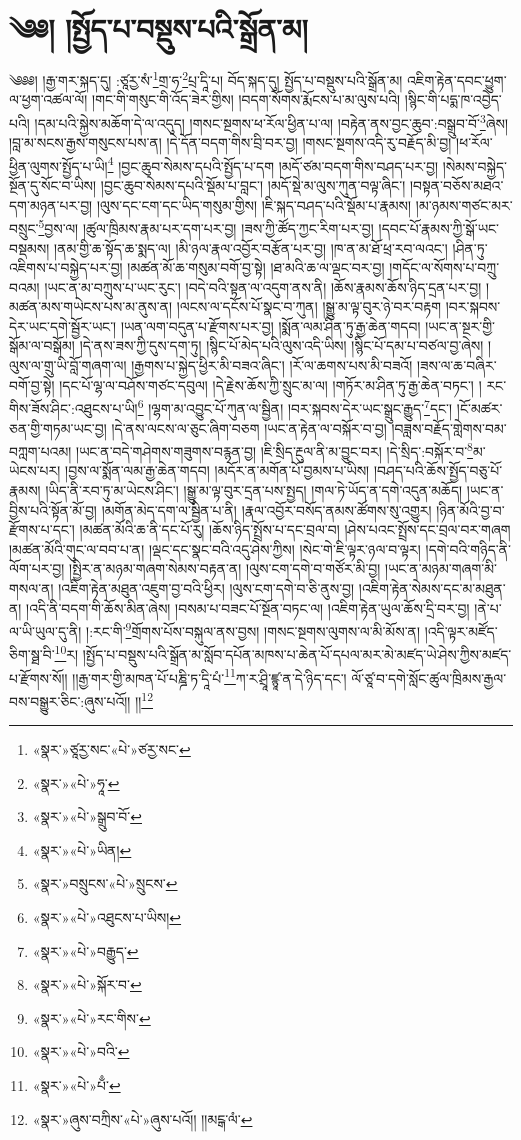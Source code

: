\chapter{༄༅། །སྤྱོད་པ་བསྡུས་པའི་སྒྲོན་མ།}༄༅༅། །རྒྱ་གར་སྐད་དུ། :ཙཱརྱ་སཾ་\footnote{«སྣར་»ཙཱརྱ་སང་«པེ་»ཙརྱ་སང་}གྲ་ཧ་\footnote{«སྣར་»«པེ་»ཧཱ་}པྲ་དཱི་པ། བོད་སྐད་དུ། སྤྱོད་པ་བསྡུས་པའི་སྒྲོན་མ། འཇིག་རྟེན་དབང་ཕྱུག་ལ་ཕྱག་འཚལ་ལོ། །གང་གི་གསུང་གི་འོད་ཟེར་གྱིས། །བདག་སོགས་རྨོངས་པ་མ་ལུས་པའི། །སྙིང་གི་པདྨ་ཁ་འབྱེད་པའི། །དམ་པའི་སྐྱེས་མཆོག་དེ་ལ་འདུད། །གསང་སྔགས་ཕ་རོལ་ཕྱིན་པ་ལ། །བརྟེན་ནས་བྱང་ཆུབ་:བསྒྲུབ་བོ་\footnote{«སྣར་»«པེ་»སྒྲུབ་བོ་}ཞེས། །བླ་མ་སངས་རྒྱས་གསུངས་པས་ན། །དེ་དོན་བདག་གིས་བྲི་བར་བྱ། །གསང་སྔགས་འདི་རུ་བརྗོད་མི་བྱ། །ཕ་རོལ་ཕྱིན་ལུགས་སྤྱོད་པ་ཡི།\footnote{«སྣར་»«པེ་»ཡིན།} །བྱང་ཆུབ་སེམས་དཔའི་སྤྱོད་པ་དག །མདོ་ཙམ་བདག་གིས་བཤད་པར་བྱ། །སེམས་བསྐྱེད་སྔོན་དུ་སོང་བ་ཡིས། །བྱང་ཆུབ་སེམས་དཔའི་སྡོམ་པ་བླང་། །མདོ་སྡེ་མ་ལུས་ཀུན་བལྟ་ཞིང་། །བསྟན་བཅོས་མཐའ་དག་མཉན་པར་བྱ། །ལུས་དང་ངག་དང་ཡིད་གསུམ་གྱིས། །ཇི་སྐད་བཤད་པའི་སྡོམ་པ་རྣམས། །མ་ཉམས་གཙང་མར་བསྲུང་\footnote{«སྣར་»བསྲུངས་«པེ་»སྲུངས་}བྱས་ལ། །ཚུལ་ཁྲིམས་རྣམ་པར་དག་པར་བྱ། །ཟས་ཀྱི་ཚོད་ཀྱང་རིག་པར་བྱ། །དབང་པོ་རྣམས་ཀྱི་སྒོ་ཡང་བསྡམས། །ནམ་གྱི་ཆ་སྟོད་ཆ་སྨད་ལ། །མི་ཉལ་རྣལ་འབྱོར་བརྩོན་པར་བྱ། །ཁ་ན་མ་ཐོ་ཕྲ་རབ་ལའང་། །ཤིན་ཏུ་འཇིགས་པ་བསྐྱེད་པར་བྱ། །མཚན་མོ་ཆ་གསུམ་བགོ་བྱ་སྟེ། །ཐ་མའི་ཆ་ལ་ལྡང་བར་བྱ། །གདོང་ལ་སོགས་པ་བཀྲུ་བའམ། །ཡང་ན་མ་བཀྲུས་པ་ཡང་རུང་། །བདེ་བའི་སྟན་ལ་འདུག་ནས་ནི། །ཆོས་རྣམས་ཆོས་ཉིད་དྲན་པར་བྱ། །མཚན་མས་གཡེངས་པས་མ་ནུས་ན། །ལངས་ལ་དངོས་པོ་སྣང་བ་ཀུན། །སྒྱུ་མ་ལྟ་བུར་ཉེ་བར་བརྟག །བར་སྐབས་དེར་ཡང་དགེ་སྦྱོར་ཡང་། །ཡན་ལག་བདུན་པ་རྫོགས་པར་བྱ། །སྨོན་ལམ་ཤིན་ཏུ་རྒྱ་ཆེན་གདབ། །ཡང་ན་སྔར་གྱི་སྒོམ་ལ་བསྒོམ། །དེ་ནས་ཟས་ཀྱི་དུས་དག་ཏུ། །སྙིང་པོ་མེད་པའི་ལུས་འདི་ཡིས། །སྙིང་པོ་དམ་པ་བཙལ་བྱ་ཞེས། །ལུས་ལ་གྲུ་ཡི་བློ་གཞག་ལ། །རྒྱགས་པ་སྐྱེད་ཕྱིར་མི་བཟའ་ཞིང་། །རོ་ལ་ཆགས་པས་མི་བཟའོ། །ཟས་ལ་ཆ་བཞིར་བགོ་བྱ་སྟེ། །དང་པོ་ལྷ་ལ་བཤོས་གཙང་དབུལ། །དེ་རྗེས་ཆོས་ཀྱི་སྲུང་མ་ལ། །གཏོར་མ་ཤིན་ཏུ་རྒྱ་ཆེན་བཏང་། །
རང་གིས་ཟོས་ཤིང་:འཐུངས་པ་ཡི།\footnote{«སྣར་»«པེ་»འཐུངས་པ་ཡིས།} །ལྷག་མ་འབྱུང་པོ་ཀུན་ལ་སྦྱིན། །བར་སྐབས་དེར་ཡང་སྒྲུང་རྒྱུད་\footnote{«སྣར་»«པེ་»བརྒྱུད་}དང་། །ངོ་མཚར་ཅན་གྱི་གཏམ་ཡང་བྱ། །དེ་ནས་ལངས་ལ་ཅུང་ཞིག་བཅག །ཡང་ན་རྟེན་ལ་བསྐོར་བ་བྱ། །བཟླས་བརྗོད་གླེགས་བམ་བཀླག་པའམ། །ཡང་ན་བདེ་གཤེགས་གཟུགས་བརྙན་བྱ། །ཇི་སྲིད་རྔུལ་ནི་མ་བྱུང་བར། །དེ་སྲིད་:བསྐོར་བ་\footnote{«སྣར་»«པེ་»སྐོར་བ་}མ་ཡེངས་པར། །བྱས་ལ་སྨོན་ལམ་རྒྱ་ཆེན་གདབ། །མདོར་ན་མགོན་པོ་བྱམས་པ་ཡིས། །བཤད་པའི་ཆོས་སྤྱོད་བཅུ་པོ་རྣམས། །ཡིད་ནི་རབ་ཏུ་མ་ཡེངས་ཤིང་། །སྒྱུ་མ་ལྟ་བུར་དྲན་པས་སྤྱད། །གལ་ཏེ་ཡོད་ན་དགེ་འདུན་མཆོད། །ཡང་ན་བྱིས་པའི་སྟོན་མོ་བྱ། །མགོན་མེད་དག་ལ་སྦྱིན་པ་ནི། །རྣལ་འབྱོར་བསོད་ནམས་ཚོགས་སུ་འགྱུར། །ཉིན་མོའི་བྱ་བ་རྫོགས་པ་དང་། །མཚན་མོའི་ཆ་ནི་དང་པོ་རུ། །ཆོས་ཉིད་སྤྲོས་པ་དང་བྲལ་བ། །ཤེས་པའང་སྤྲོས་དང་བྲལ་བར་གཞག །མཚན་མོའི་གུང་ལ་བབ་པ་ན། །ལྡང་དང་སྣང་བའི་འདུ་ཤེས་ཀྱིས། །སེང་གེ་ཇི་ལྟར་ཉལ་བ་ལྟར། །དགེ་བའི་གཉིད་ནི་ལོག་པར་བྱ། །སྤྱིར་ན་མཉམ་གཞག་སེམས་བརྟན་ན། །ལུས་ངག་དགེ་བ་གཙོར་མི་བྱ། །ཡང་ན་མཉམ་གཞག་མི་གསལ་ན། །འཇིག་རྟེན་མཐུན་འཇུག་བྱ་བའི་ཕྱིར། །ལུས་ངག་དགེ་བ་ཅི་ནུས་བྱ། །འཇིག་རྟེན་སེམས་དང་མ་མཐུན་ན། །འདི་ནི་བདག་གི་ཆོས་མིན་ཞེས། །བསམ་པ་བཟང་པོ་སྔོན་བཏང་ལ། །འཇིག་རྟེན་ཡུལ་ཆོས་དྲི་བར་བྱ། །ནེ་པ་ལ་ཡི་ཡུལ་དུ་ནི། །:རང་གི་\footnote{«སྣར་»«པེ་»རང་གིས་}གྲོགས་པོས་བསྐུལ་ནས་བྱས། །གསང་སྔགས་ལུགས་ལ་མི་མོས་ན། །འདི་ལྟར་མཛོད་ཅིག་སྠ་བི་\footnote{«སྣར་»«པེ་»བའི་}ར། །སྤྱོད་པ་བསྡུས་པའི་སྒྲོན་མ་སློབ་དཔོན་མཁས་པ་ཆེན་པོ་དཔལ་མར་མེ་མཛད་ཡེ་ཤེས་ཀྱིས་མཛད་པ་རྫོགས་སོ།། །།རྒྱ་གར་གྱི་མཁན་པོ་པཎྜི་ཏ་དཱི་པཾ་\footnote{«སྣར་»«པེ་»པྃ་}ཀ་ར་ཤྲཱི་ཛྙཱ་ན་དེ་ཉིད་དང་། ལོ་ཙཱ་བ་དགེ་སློང་ཚུལ་ཁྲིམས་རྒྱལ་བས་བསྒྱུར་ཅིང་:ཞུས་པའོ།། །།\footnote{«སྣར་»ཞུས་བཀྲིས་«པེ་»ཞུས་པའོ།། །།མངྒ་ལཾ་}
